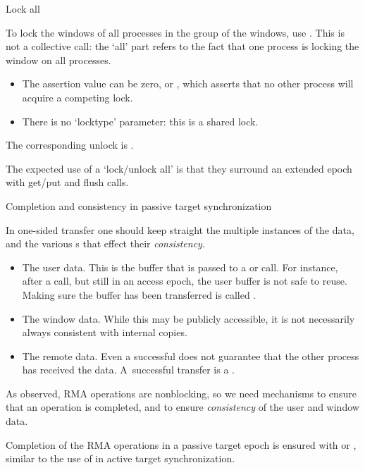  {Lock all}
\label{sec:win-lock-all}

To lock the windows of all processes in the group of the windows, use
. This is not a collective call:
the `all' part refers to the fact that one process is locking the
window on all processes.
\begin{itemize}
\item
  The assertion value can be zero, or ,
  which asserts that no other process will acquire a competing lock.
\item There is no `locktype' parameter: this is a shared lock.
\end{itemize}

The corresponding unlock is
.

The expected use of a `lock/unlock all' is that they surround
an extended epoch with get/put and flush calls.

 {Completion and consistency in passive target synchronization}

In one-sided transfer one should keep straight the multiple instances
of the data, and the various s that effect
their \emph{consistency}.
\begin{itemize}
\item The user data. This is the buffer that is passed to a  or
   call. For instance, after a  call, but still in an
  access epoch, the user buffer is not safe to reuse. Making sure the
  buffer has been transferred is called .
\item The window data. While this may be publicly accessible, it is
  not necessarily always consistent with internal copies.
\item The remote data. Even a successful  does not guarantee
  that the other process has received the data. A~successful transfer
  is a .
\end{itemize}

As observed, \ac{RMA} operations are nonblocking, so we need
mechanisms to ensure that an operation is completed,
and to ensure \emph{consistency} of the
user and window data.

Completion of the \ac{RMA} operations in a  passive target epoch
is ensured with
 or ,
similar to the use of 
in active target synchronization.

